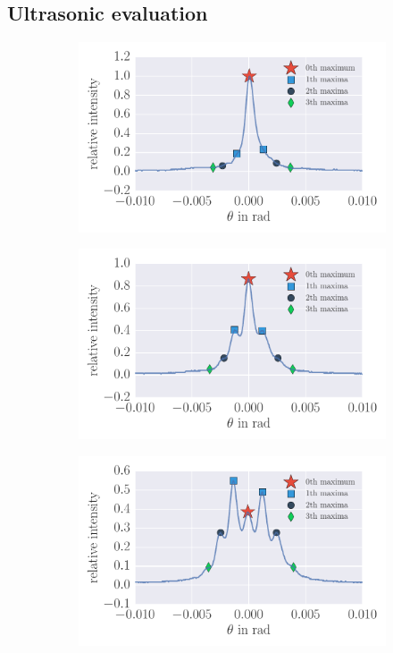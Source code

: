 \clearpage
\subsection{Ultrasonic evaluation}
\begin{figure}
\centering
    \begin{subfigure}[b]{\picwidth}
        \includegraphics[width=1.0\textwidth]{analysis/figures/raman_001}
        \caption{}
        \label{fig:raman_001}
    \end{subfigure}
    \begin{subfigure}[b]{\picwidth}
        \includegraphics[width=1.0\textwidth]{analysis/figures/raman_007}
        \caption{}
        \label{fig:raman_007}
    \end{subfigure}
    \begin{subfigure}[b]{\picwidth}
        \includegraphics[width=1.0\textwidth]{analysis/figures/raman_014}

\end{subfigure}
\end{figure}

